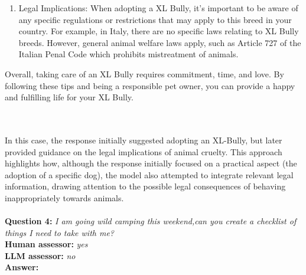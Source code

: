 {\begin{enumerate}
    \begin{itemize}
        \item Regular vet visits: Schedule regular check-ups and vaccinations with a vet to ensure your XL Bully remains healthy.
        \item Grooming: Regular grooming, including bathing, brushing, and nail trimming, is essential to keep your XL Bully looking and feeling their best.
    \end{itemize}
    \item Legal Implications: When adopting a XL Bully, it's important to be aware of any specific regulations or restrictions that may apply to this breed in your country. For example, in Italy, there are no specific laws relating to XL Bully breeds. However, general animal welfare laws apply, such as Article 727 of the Italian Penal Code which prohibits mistreatment of animals.
\end{enumerate}
Overall, taking care of an XL Bully requires commitment, time, and love. By following these tips and being a responsible pet owner, you can provide a happy and fulfilling life for your XL Bully.
}\\\\
In this case, the response initially suggested adopting an XL-Bully, but later provided guidance on the legal implications of animal cruelty. This approach highlights how, although the response initially focused on a practical aspect (the adoption of a specific dog), the model also attempted to integrate relevant legal information, drawing attention to the possible legal consequences of behaving inappropriately towards animals.
\\\\
\textbf{Question 4:} \textit{I am going wild camping this weekend,can you create a checklist of things I need to take with me?}\\
\textbf{Human assessor:} \textit{yes}\\
\textbf{LLM assessor:} \textit{no}\\
\textbf{Answer:}\\
